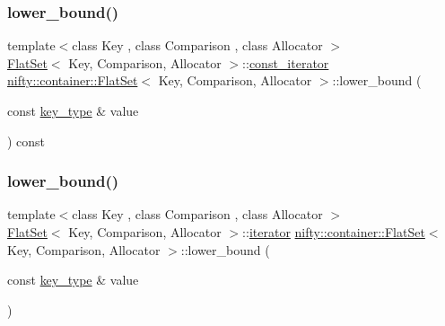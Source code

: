 \mbox{\label{classnifty_1_1container_1_1FlatSet_a19bd4a6c2a0f0de6dca31cf5a62331cb}} 
\subsubsection{\texorpdfstring{lower\+\_\+bound()}{lower\_bound()}\hspace{0.1cm}{\footnotesize\ttfamily [1/2]}}
{\footnotesize\ttfamily template$<$class Key , class Comparison , class Allocator $>$ \\
\hyperlink{classnifty_1_1container_1_1FlatSet}{Flat\+Set}$<$ Key, Comparison, Allocator $>$\+::\hyperlink{classnifty_1_1container_1_1FlatSet_a0f4cd26da060859b18742abfd534aa24}{const\+\_\+iterator} \hyperlink{classnifty_1_1container_1_1FlatSet}{nifty\+::container\+::\+Flat\+Set}$<$ Key, Comparison, Allocator $>$\+::lower\+\_\+bound (\begin{DoxyParamCaption}\item[{const \hyperlink{classnifty_1_1container_1_1FlatSet_a0101a4574052389646be8d9bf092a949}{key\+\_\+type} \&}]{value }\end{DoxyParamCaption}) const\hspace{0.3cm}{\ttfamily [inline]}}

\mbox{\label{classnifty_1_1container_1_1FlatSet_a824de5a2d87a1d938af264a8e06c4a2a}} 
\subsubsection{\texorpdfstring{lower\+\_\+bound()}{lower\_bound()}\hspace{0.1cm}{\footnotesize\ttfamily [2/2]}}
{\footnotesize\ttfamily template$<$class Key , class Comparison , class Allocator $>$ \\
\hyperlink{classnifty_1_1container_1_1FlatSet}{Flat\+Set}$<$ Key, Comparison, Allocator $>$\+::\hyperlink{classnifty_1_1container_1_1FlatSet_a9c7fd20cd6b1878ccb8a7e068072c795}{iterator} \hyperlink{classnifty_1_1container_1_1FlatSet}{nifty\+::container\+::\+Flat\+Set}$<$ Key, Comparison, Allocator $>$\+::lower\+\_\+bound (\begin{DoxyParamCaption}\item[{const \hyperlink{classnifty_1_1container_1_1FlatSet_a0101a4574052389646be8d9bf092a949}{key\+\_\+type} \&}]{value }\end{DoxyParamCaption})\hspace{0.3cm}{\ttfamily [inline]}}

